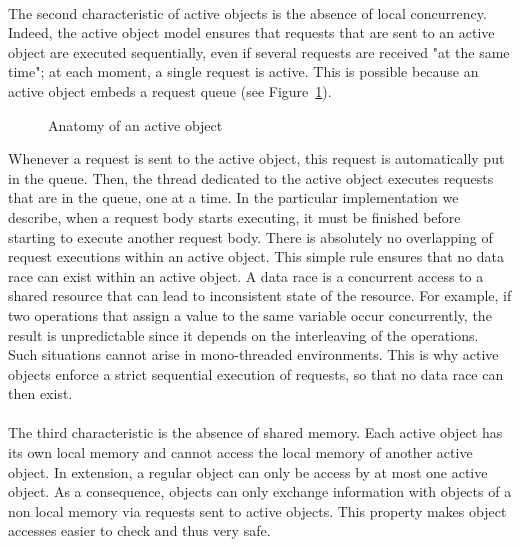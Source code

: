\documentclass[11pt]{report}
\begin{document}
\paragraph{}
The second characteristic of active objects is the absence of local concurrency. Indeed, the active object model ensures that requests that are sent to an active object are executed sequentially, even if several requests are received "at the same time"; at each moment, a single request is active.
This is possible because an active object embeds a request queue (see Figure~\ref{fig:active_object}).
\begin{figure}[ht]
      \caption{Anatomy of an active object}
      \label{fig:active_object}
\end{figure}
Whenever a request is sent to the active object, this request is automatically put in the queue. Then, the thread dedicated to the active object executes requests that are in the queue, one at a time. In the particular implementation we describe, when a request body starts executing, it must be finished before starting to execute another request body. There is absolutely no overlapping of request executions within an active object.
This simple rule ensures that no data race can exist within an active object. A data race is a concurrent access to a shared resource that can lead to inconsistent state of the resource. For example, if two operations that assign a value to the same variable occur concurrently, the result is unpredictable since it depends on the interleaving of the operations.
Such situations cannot arise in mono-threaded environments. This is why active objects enforce a strict sequential execution of requests, so that no data race can then exist.

\paragraph{}
The third characteristic is the absence of shared memory. Each active object has its own local memory and cannot access the local memory of another active object. In extension, a regular object can only be access by at most one active object. As a consequence, objects can only exchange information with objects of a non local memory via requests sent to active objects. This property makes object accesses easier to check and thus very safe.
\end{document}
